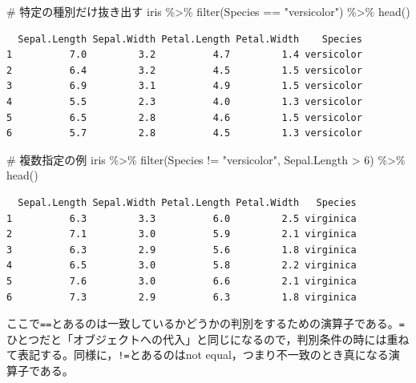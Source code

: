 \documentclass[
  a4paper,
]{ltjsbook}
\newenvironment{Shaded}{\begin{snugshade}}{\end{snugshade}}
\newcommand{\CommentTok}[1]{\textcolor[rgb]{0.37,0.37,0.37}{#1}}
\newcommand{\DecValTok}[1]{\textcolor[rgb]{0.68,0.00,0.00}{#1}}
\newcommand{\FunctionTok}[1]{\textcolor[rgb]{0.28,0.35,0.67}{#1}}
\newcommand{\NormalTok}[1]{\textcolor[rgb]{0.00,0.23,0.31}{#1}}
\newcommand{\SpecialCharTok}[1]{\textcolor[rgb]{0.37,0.37,0.37}{#1}}
\newcommand{\StringTok}[1]{\textcolor[rgb]{0.13,0.47,0.30}{#1}}
\begin{document}
\begin{Shaded}
\begin{Highlighting}[]
\CommentTok{\# 特定の種別だけ抜き出す}
\NormalTok{iris }\SpecialCharTok{\%\textgreater{}\%}
  \FunctionTok{filter}\NormalTok{(Species }\SpecialCharTok{==} \StringTok{"versicolor"}\NormalTok{) }\SpecialCharTok{\%\textgreater{}\%}
  \FunctionTok{head}\NormalTok{()}
\end{Highlighting}
\end{Shaded}

\begin{verbatim}
  Sepal.Length Sepal.Width Petal.Length Petal.Width    Species
1          7.0         3.2          4.7         1.4 versicolor
2          6.4         3.2          4.5         1.5 versicolor
3          6.9         3.1          4.9         1.5 versicolor
4          5.5         2.3          4.0         1.3 versicolor
5          6.5         2.8          4.6         1.5 versicolor
6          5.7         2.8          4.5         1.3 versicolor
\end{verbatim}

\begin{Shaded}
\begin{Highlighting}[]
\CommentTok{\# 複数指定の例}
\NormalTok{iris }\SpecialCharTok{\%\textgreater{}\%}
  \FunctionTok{filter}\NormalTok{(Species }\SpecialCharTok{!=} \StringTok{"versicolor"}\NormalTok{, Sepal.Length }\SpecialCharTok{\textgreater{}} \DecValTok{6}\NormalTok{) }\SpecialCharTok{\%\textgreater{}\%}
  \FunctionTok{head}\NormalTok{()}
\end{Highlighting}
\end{Shaded}

\begin{verbatim}
  Sepal.Length Sepal.Width Petal.Length Petal.Width   Species
1          6.3         3.3          6.0         2.5 virginica
2          7.1         3.0          5.9         2.1 virginica
3          6.3         2.9          5.6         1.8 virginica
4          6.5         3.0          5.8         2.2 virginica
5          7.6         3.0          6.6         2.1 virginica
6          7.3         2.9          6.3         1.8 virginica
\end{verbatim}

ここで\texttt{==}とあるのは一致しているかどうかの判別をするための演算子である。\texttt{=}ひとつだと「オブジェクトへの代入」と同じになるので，判別条件の時には重ねて表記する。同様に，\texttt{!=}とあるのはnot
equal，つまり不一致のとき真になる演算子である。
\end{document}
